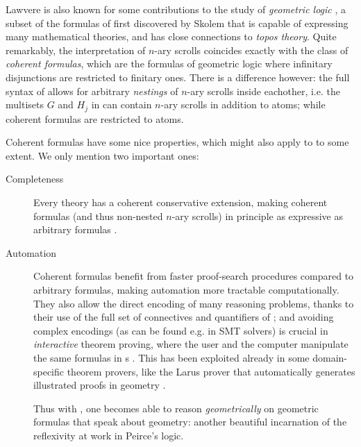 \begin{scope}
Lawvere is also known for some contributions to the study of \emph{geometric
logic} , a subset of the formulas of  first
discovered by Skolem  that is capable of expressing
many mathematical theories, and has close connections to \emph{topos theory}.
Quite remarkably, the interpretation of $n$-ary scrolls coincides exactly with
the class of \emph{coherent formulas}, which are the formulas of geometric logic
where infinitary disjunctions are restricted to finitary ones. There is a
difference however: the full syntax of  allows for arbitrary \emph{nestings}
of $n$-ary scrolls inside eachother, i.e. the multisets $G$ and $H_j$ in
 can contain $n$-ary scrolls in addition to atoms; while
coherent formulas are restricted to atoms.

Coherent formulas have some nice properties, which might also apply to  to
some extent. We only mention two important ones:
\begin{description}
  \item[Completeness] Every  theory has a coherent conservative
  extension, making coherent formulas (and thus non-nested $n$-ary scrolls) in
  principle as expressive as arbitrary  formulas
  .
  
  \item[Automation] Coherent formulas benefit from faster proof-search
  procedures compared to arbitrary formulas, making automation more tractable
  computationally. They also allow the direct encoding of many reasoning
  problems, thanks to their use of the full set of connectives and quantifiers
  of ; and avoiding complex encodings (as can be found e.g. in SMT solvers)
  is crucial in \emph{interactive} theorem proving, where the user and the
  computer manipulate the same formulas in s
  . This has been exploited already in some
  domain-specific theorem provers, like the Larus prover that automatically
  generates illustrated proofs in geometry
  .
  
  \begin{remark}
  Thus with , one becomes able to reason \emph{geometrically} on geometric
  formulas that speak about geometry: another beautiful incarnation of the
  reflexivity at work in Peirce's  logic.
  \end{remark}
\end{description}


\end{scope}
